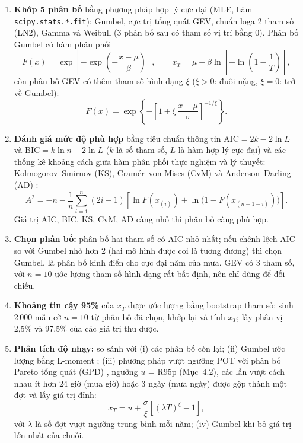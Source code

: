 \begin{enumerate}[label=\textbf{Bước \arabic*.}, leftmargin=2cm]
  \item \textbf{Khớp 5 phân bố} bằng phương pháp hợp lý cực đại (MLE, hàm \texttt{scipy.stats.*.fit}): Gumbel, cực trị tổng quát GEV, chuẩn loga 2 tham số (LN2), Gamma và Weibull (3 phân bố sau có tham số vị trí bằng 0). Phân bố Gumbel có hàm phân phối
  \begin{equation}
    F(x) = \exp\!\left[-\exp\!\left(-\frac{x-\mu}{\beta}\right)\right], \qquad
    x_T = \mu - \beta \ln\!\left[-\ln\!\left(1 - \frac{1}{T}\right)\right],
  \end{equation}
  còn phân bố GEV \cite{coles2001} có thêm tham số hình dạng $\xi$ ($\xi > 0$: đuôi nặng, $\xi = 0$: trở về Gumbel):
  \begin{equation}
    F(x) = \exp\!\left\{-\left[1 + \xi\,\frac{x-\mu}{\sigma}\right]^{-1/\xi}\right\}.
  \end{equation}
  \item \textbf{Đánh giá mức độ phù hợp} bằng tiêu chuẩn thông tin $\text{AIC} = 2k - 2\ln L$ và $\text{BIC} = k\ln n - 2\ln L$ \cite{akaike1974} ($k$ là số tham số, $L$ là hàm hợp lý cực đại) và các thống kê khoảng cách giữa hàm phân phối thực nghiệm và lý thuyết: Kolmogorov--Smirnov (KS), Cramér--von Mises (CvM) và Anderson--Darling (AD) \cite{stephens1974}:
  \begin{equation}
    A^2 = -n - \frac{1}{n}\sum_{i=1}^{n} (2i-1)\left[\ln F(x_{(i)}) + \ln\bigl(1 - F(x_{(n+1-i)})\bigr)\right].
  \end{equation}
  Giá trị AIC, BIC, KS, CvM, AD càng nhỏ thì phân bố càng phù hợp.
  \item \textbf{Chọn phân bố:} phân bố hai tham số có AIC nhỏ nhất; nếu chênh lệch AIC so với Gumbel nhỏ hơn 2 (hai mô hình được coi là tương đương) thì chọn Gumbel, là phân bố kinh điển cho cực đại năm của mưa. GEV có 3 tham số, với $n = 10$ ước lượng tham số hình dạng rất bất định, nên chỉ dùng để đối chiếu.
  \item \textbf{Khoảng tin cậy 95\%} của $x_T$ được ước lượng bằng bootstrap tham số: sinh 2\,000 mẫu cỡ $n = 10$ từ phân bố đã chọn, khớp lại và tính $x_T$; lấy phân vị 2,5\% và 97,5\% của các giá trị thu được.
  \item \textbf{Phân tích độ nhạy:} so sánh với (i) các phân bố còn lại; (ii) Gumbel ước lượng bằng L-moment \cite{hosking1990}; (iii) phương pháp vượt ngưỡng POT với phân bố Pareto tổng quát (GPD) \cite{pickands1975}, ngưỡng $u$ = R95p (Mục~4.2), các lần vượt cách nhau ít hơn 24 giờ (mưa giờ) hoặc 3 ngày (mưa ngày) được gộp thành một đợt và lấy giá trị đỉnh:
  \begin{equation}
    x_T = u + \frac{\sigma}{\xi}\left[(\lambda T)^{\xi} - 1\right],
  \end{equation}
  với $\lambda$ là số đợt vượt ngưỡng trung bình mỗi năm; (iv) Gumbel khi bỏ giá trị lớn nhất của chuỗi.
\end{enumerate}

